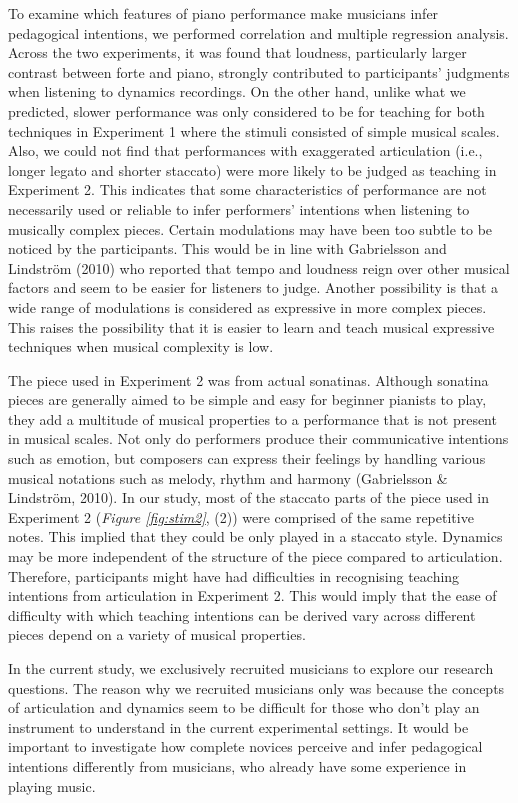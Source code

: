 \documentclass[
  man,floatsintext]{apa6}
\begin{document}
To examine which features of piano performance make musicians infer pedagogical intentions, we performed correlation and multiple regression analysis. Across the two experiments, it was found that loudness, particularly larger contrast between forte and piano, strongly contributed to participants' judgments when listening to dynamics recordings. On the other hand, unlike what we predicted, slower performance was only considered to be for teaching for both techniques in Experiment 1 where the stimuli consisted of simple musical scales. Also, we could not find that performances with exaggerated articulation (i.e., longer legato and shorter staccato) were more likely to be judged as teaching in Experiment 2. This indicates that some characteristics of performance are not necessarily used or reliable to infer performers' intentions when listening to musically complex pieces. Certain modulations may have been too subtle to be noticed by the participants. This would be in line with Gabrielsson and Lindström (2010) who reported that tempo and loudness reign over other musical factors and seem to be easier for listeners to judge. Another possibility is that a wide range of modulations is considered as expressive in more complex pieces. This raises the possibility that it is easier to learn and teach musical expressive techniques when musical complexity is low.

The piece used in Experiment 2 was from actual sonatinas. Although sonatina pieces are generally aimed to be simple and easy for beginner pianists to play, they add a multitude of musical properties to a performance that is not present in musical scales. Not only do performers produce their communicative intentions such as emotion, but composers can express their feelings by handling various musical notations such as melody, rhythm and harmony (Gabrielsson \& Lindström, 2010). In our study, most of the staccato parts of the piece used in Experiment 2 (\emph{Figure \ref{fig:stim2}}, (2)) were comprised of the same repetitive notes. This implied that they could be only played in a staccato style. Dynamics may be more independent of the structure of the piece compared to articulation. Therefore, participants might have had difficulties in recognising teaching intentions from articulation in Experiment 2. This would imply that the ease of difficulty with which teaching intentions can be derived vary across different pieces depend on a variety of musical properties.

In the current study, we exclusively recruited musicians to explore our research questions. The reason why we recruited musicians only was because the concepts of articulation and dynamics seem to be difficult for those who don't play an instrument to understand in the current experimental settings. It would be important to investigate how complete novices perceive and infer pedagogical intentions differently from musicians, who already have some experience in playing music.
\end{document}
